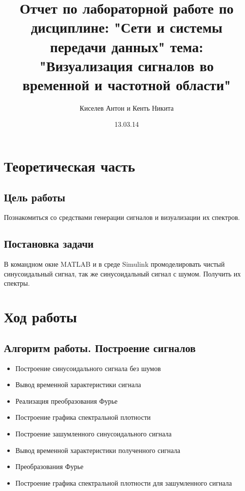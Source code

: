 \documentclass[10pt,a4paper]{report}
\author{Киселев Антон и Кенть Никита}
\title{Отчет по лабораторной работе по дисциплине: "Сети и системы передачи данных"\newline
тема: "Визуализация сигналов во временной и частотной области"}
\date{13.03.14}
\begin{document}
\maketitle
\pagebreak
\chapter{Теоретическая часть}
\section{Цель работы}
Познакомиться со средствами генерации сигналов и визуализации их спектров.
\section{Постановка задачи}
В командном окне MATLAB и в среде Simulink промоделировать чистый синусоидальный сигнал, 
так же синусоидальный сигнал с шумом. Получить их спектры.

\chapter{Ход работы}
\section{Алгоритм работы. Построение сигналов}
\begin{itemize}
\item Построение синусоидального сигнала без шумов
\item Вывод временной характеристики сигнала
\item Реализация  преобразования Фурье 
\item Построение графика спектральной плотности 
\item Построение зашумленного синусоидального сигнала  
\item Вывод временной характеристики полученного сигнала
\item Преобразования Фурье 
\item Построение графика спектральной плотности для зашумленного сигнала
\end{itemize}
\end{document}
